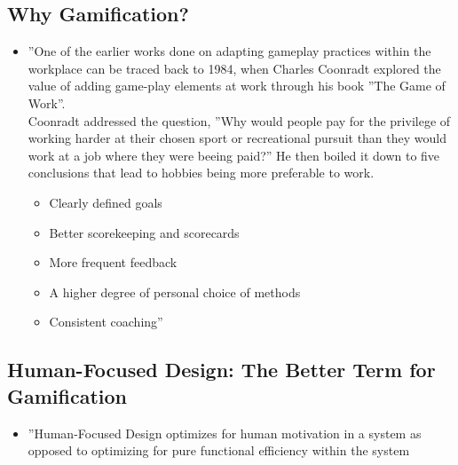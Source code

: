 \subsection{Why Gamification?}
\begin{itemize}
    \item ''One of the earlier works done on adapting gameplay practices within the workplace can be traced back to 1984, when Charles Coonradt explored the value of adding game-play elements at work through his book ''The Game of Work''. \cite{game_work} \\
    Coonradt addressed the question, ''Why would people pay for the privilege of working harder at their chosen sport or recreational pursuit than they would work at a job where they were beeing paid?'' He then boiled it down to five conclusions that lead to hobbies being more preferable to work.
    \begin{itemize}
        \item Clearly defined goals
        \item Better scorekeeping and scorecards
        \item More frequent feedback
        \item A higher degree of personal choice of methods
        \item Consistent coaching''
    \end{itemize}
\end{itemize}

\subsection{Human-Focused Design: The Better Term for Gamification}
\begin{itemize}
    \item ''Human-Focused Design optimizes for human motivation in a system as opposed to optimizing for pure functional efficiency within the system
\end{itemize}

